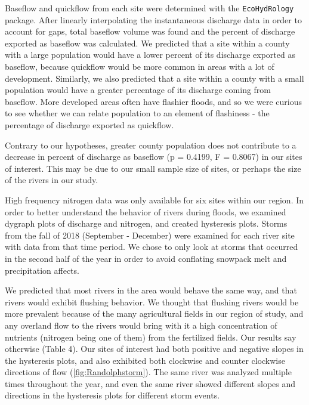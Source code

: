 \documentclass[12pt,]{article}
\begin{document}
Baseflow and quickflow from each site were determined with the
\texttt{EcoHydRology} package. After linearly interpolating the
instantaneous discharge data in order to account for gaps, total
baseflow volume was found and the percent of discharge exported as
baseflow was calculated. We predicted that a site within a county with a
large population would have a lower percent of its discharge exported as
baseflow, because quickflow would be more common in areas with a lot of
development. Similarly, we also predicted that a site within a county
with a small population would have a greater percentage of its discharge
coming from baseflow. More developed areas often have flashier floods,
and so we were curious to see whether we can relate population to an
element of flashiness - the percentage of discharge exported as
quickflow.

Contrary to our hypotheses, greater county population does not
contribute to a decrease in percent of discharge as baseflow (p =
0.4199, F = 0.8067) in our sites of interest. This may be due to our
small sample size of sites, or perhaps the size of the rivers in our
study.

High frequency nitrogen data was only available for six sites within our
region. In order to better understand the behavior of rivers during
floods, we examined dygraph plots of discharge and nitrogen, and created
hysteresis plots. Storms from the fall of 2018 (September - December)
were examined for each river site with data from that time period. We
chose to only look at storms that occurred in the second half of the
year in order to avoid conflating snowpack melt and precipitation
affects.

We predicted that most rivers in the area would behave the same way, and
that rivers would exhibit flushing behavior. We thought that flushing
rivers would be more prevalent because of the many agricultural fields
in our region of study, and any overland flow to the rivers would bring
with it a high concentration of nutrients (nitrogen being one of them)
from the fertilized fields. Our results say otherwise (Table 4). Our
sites of interest had both positive and negative slopes in the
hysteresis plots, and also exhibited both clockwise and counter
clockwise directions of flow (\autoref{fig:Randolphstorm}). The same
river was analyzed multiple times throughout the year, and even the same
river showed different slopes and directions in the hysteresis plots for
different storm events.
\end{document}
